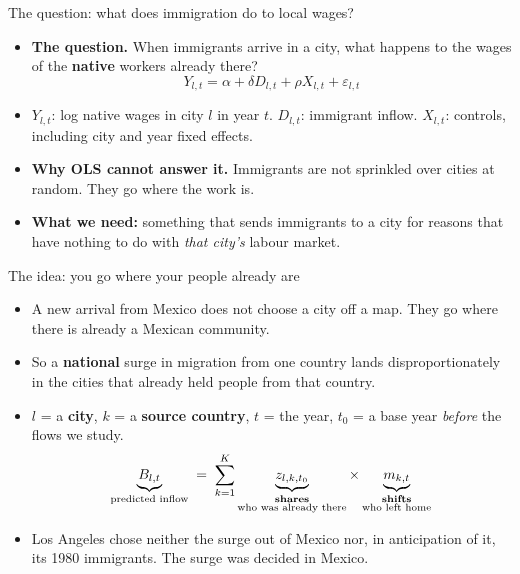 \documentclass[
  11pt,
  ignorenonframetext,
  aspectratio=169,
]{beamer}
\providecommand{\tightlist}{%
  \setlength{\itemsep}{0pt}\setlength{\parskip}{0pt}}
\begin{document}
\begin{frame}{The question: what does immigration do to local wages?}
\protect{}\label{the-question-what-does-immigration-do-to-local-wages}
\begin{itemize}
\tightlist
\item
  \textbf{The question.} When immigrants arrive in a city, what happens
  to the wages of the \textbf{native} workers already there? \[
  Y_{l,t} = \alpha + \delta D_{l,t} + \rho X_{l,t} + \varepsilon_{l,t}
  \]
\end{itemize}

\vspace{-0.2em}

\begin{itemize}
\tightlist
\item
  \(Y_{l,t}\): log native wages in city \(l\) in year \(t\).
  \(D_{l,t}\): immigrant inflow. \(X_{l,t}\): controls, including city
  and year fixed effects.
\item
  \textbf{Why OLS cannot answer it.} Immigrants are not sprinkled over
  cities at random. They go where the work is.
\item
  \textbf{What we need:} something that sends immigrants to a city for
  reasons that have nothing to do with \emph{that city's} labour market.
\end{itemize}
\end{frame}

\begin{frame}{The idea: you go where your people already are}
\protect{}\label{the-idea-you-go-where-your-people-already-are}
\begin{itemize}
\tightlist
\item
  A new arrival from Mexico does not choose a city off a map. They go
  where there is already a Mexican community.
\item
  So a \textbf{national} surge in migration from one country lands
  disproportionately in the cities that already held people from that
  country.
\item
  \(l\) = a \textbf{city}, \(k\) = a \textbf{source country}, \(t\) =
  the year, \(t_0\) = a base year \emph{before} the flows we study. \[
  \underbrace{B_{l,t}}_{\text{predicted inflow}} \;=\; \sum_{k=1}^{K} \underbrace{z_{l,k,t_0}}_{\substack{\text{\textbf{shares}} \\ \text{who was already there}}} \times \underbrace{m_{k,t}}_{\substack{\text{\textbf{shifts}} \\ \text{who left home}}}
  \]
\end{itemize}

\vspace{0.2em}

\begin{itemize}
\tightlist
\item
  Los Angeles chose neither the surge out of Mexico nor, in anticipation
  of it, its 1980 immigrants. The surge was decided in Mexico.
\end{itemize}
\end{frame}
\end{document}
